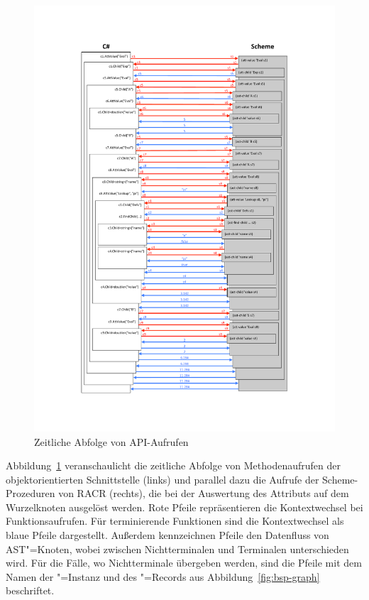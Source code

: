 \begin{figure}[]
	\centering
	\includegraphics[scale=0.83]{figures/call-stack.pdf}
	\caption{Zeitliche Abfolge von API-Aufrufen}
	\label{fig:bsp-stack}
\end{figure}

Abbildung~\ref{fig:bsp-stack} veranschaulicht die zeitliche Abfolge von Methodenaufrufen der objektorientierten Schnittstelle (links) und parallel dazu die Aufrufe der Scheme-Prozeduren von RACR (rechts), die bei der Auswertung des Attributs  auf dem Wurzelknoten ausgelöst werden. Rote Pfeile repräsentieren die Kontextwechsel bei Funktionsaufrufen. Für terminierende Funktionen sind die Kontextwechsel als blaue Pfeile dargestellt. Außerdem kennzeichnen Pfeile den Datenfluss von AST"=Knoten, wobei zwischen Nichtterminalen und Terminalen unterschieden wird. Für die Fälle, wo Nichtterminale übergeben werden, sind die Pfeile mit dem Namen der "=Instanz und des "=Records aus Abbildung~\ref{fig:bsp-graph} beschriftet.

